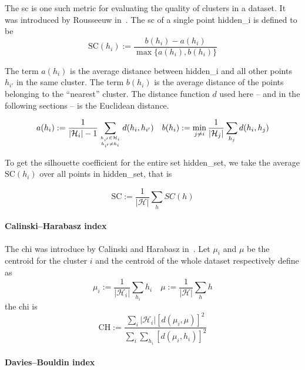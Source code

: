 The \acrfull{sc} is one such metric for evaluating the quality of clusters in a dataset. It was introduced by Rousseeuw in~\cite{SilhouettesARousse1987}.
The \acrlong{sc} of a single point \gls{hidden_i} is defined to be
\begin{equation*}
  \textrm{SC}(h_i) := \frac{b(h_i) - a(h_i)}{\max\{a(h_i), b(h_i)\}}
\end{equation*}

The term $a(h_i)$ is the average distance between \gls{hidden_i} and all other points $h_{i'}$ in the same cluster. The term $b(h_i)$ is the average distance of the points belonging to the ``nearest'' cluster. The distance function $d$ used here -- and in the following sections -- is the Euclidean distance.

\begin{equation*}
  a(h_i) := \frac{1}{|\mathcal{H}_i| - 1} \sum_{h_{i'} \in \mathcal{H}_i \atop h_{i'} \neq h_{i}} d(h_{i}, h_{i'}) \quad
  b(h_i) := \min_{j \neq i} \frac{1}{|\mathcal{H}_j|} \sum_{h_j} d(h_i, h_j)
\end{equation*}

To get the silhouette coefficient for the entire set \gls{hidden_set}, we take the average $\textrm{SC}(h_i)$ over all points in \gls{hidden_set}, that is

\begin{equation}
  \textrm{SC} := \frac{1}{|\mathcal{H}|} \sum_{h} SC(h)
  \label{eq:sc}
\end{equation}

\paragraph{Calinski–Harabasz index}
\label{par:calinski–harabasz-index}

The \acrfull{chi} was introduce by Calinski and Harabasz in~\cite{ADendriteMethCalins1974}. Let $\mu_i$ and $\mu$ be the centroid for the cluster $i$ and the centroid of the whole dataset respectively define as
\begin{equation*}
  \mu_i := \frac{1}{|\mathcal{H}_i|} \sum_{h_i} h_i \quad
  \mu := \frac{1}{|\mathcal{H}|} \sum_{h} h
\end{equation*}
the \acrlong{chi} is
\begin{equation}
\textrm{CH} := \frac
  {\sum_i |\mathcal{H}_i| {\left[d(\mu_i, \mu)\right]}^2}
  {\sum_i \sum_{h_i} {\left[d(\mu_i, h_i)\right]}^2}
  \label{eq:chi}
\end{equation}

\paragraph{Davies–Bouldin index}
\label{par:Davies–Bouldin-index}

